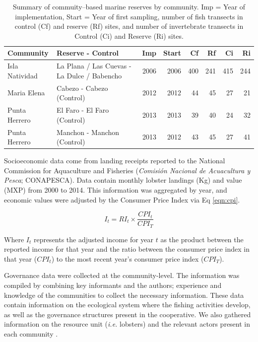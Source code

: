 \documentclass{frontiersSCNS}
\theoremstyle{definition}
\theoremstyle{definition}
\theoremstyle{definition}
\theoremstyle{remark}
\begin{document}
\begin{table}

\caption{\label{tab:unnamed-chunk-2}\label{table:com_sum} Summary of commuity--based marine reserves by community. Imp = Year of implementation, Start = Year of first sampling, number of fish transects in control (Cf) and reserve (Rf) sites, and number of invertebrate transects in Control (Ci) and Reserve (Ri) sites.}
\centering
\begin{tabular}[t]{l|l|r|r|r|r|r|r}
\hline
Community & Reserve - Control & Imp & Start & Cf & Rf & Ci & Ri\\
\hline
Isla Natividad & La Plana / Las Cuevas - La Dulce / Babencho & 2006 & 2006 & 400 & 241 & 415 & 244\\
\hline
Maria Elena & Cabezo - Cabezo (Control) & 2012 & 2012 & 44 & 45 & 27 & 21\\
\hline
Punta Herrero & El Faro - El Faro (Control) & 2013 & 2013 & 39 & 40 & 24 & 32\\
\hline
Punta Herrero & Manchon - Manchon (Control) & 2013 & 2012 & 43 & 45 & 27 & 41\\
\hline
\end{tabular}
\end{table}

Socioeconomic data come from landing receipts reported to the National
Commission for Aquaculture and Fisheries (\emph{Comisión Nacional de
Acuacultura y Pesca}; CONAPESCA). Data contain monthly lobster landings
(Kg) and value (MXP) from 2000 to 2014. This information was aggregated
by year, and economic values were adjusted by the Consumer Price Index
\citep{oecd_2017-VV} via Eq \ref{eqn:cpi}.

\begin{equation}
I_t = RI_t\times\frac{CPI_t}{CPI_T}
\label{eqn:cpi}
\end{equation}

Where \(I_t\) represents the adjusted income for year \(t\) as the
product between the reported income for that year and the ratio between
the consumer price index in that year (\(CPI_t\)) to the most recent
year's consumer price index (\(CPI_T\)).

Governance data were collected at the community-level. The information
was compiled by combining key informants and the authors; experience and
knowledge of the communities to collect the necessary information. These
data contain information on the ecological system where the fishing
activities develop, as well as the governance structures present in the
cooperative. We also gathered information on the resource unit
(\emph{i.e.} lobsters) and the relevant actors present in each community
\citep{leslie_2015-na}.
\end{document}
